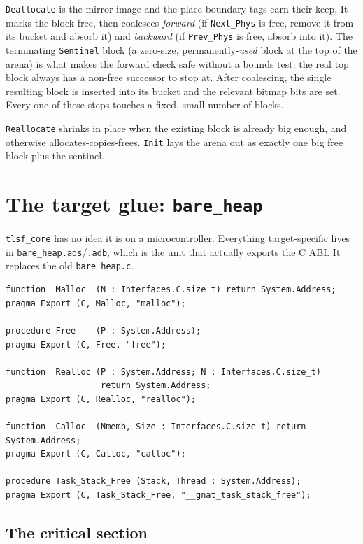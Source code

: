 \texttt{Deallocate} is the mirror image and the place boundary tags earn their
keep. It marks the block free, then coalesces \emph{forward} (if
\texttt{Next\_Phys} is free, remove it from its bucket and absorb it) and
\emph{backward} (if \texttt{Prev\_Phys} is free, absorb into it). The terminating
\texttt{Sentinel} block (a zero-size, permanently-\emph{used} block at the top
of the arena) is what makes the forward check safe without a bounds test: the
real top block always has a non-free successor to stop at. After coalescing, the
single resulting block is inserted into its bucket and the relevant bitmap bits
are set. Every one of these steps touches a fixed, small number of blocks.

\texttt{Reallocate} shrinks in place when the existing block is already big
enough, and otherwise allocates-copies-frees. \texttt{Init} lays the arena out as
exactly one big free block plus the sentinel.

\section{The target glue: \texttt{bare\_heap}}

\texttt{tlsf\_core} has no idea it is on a microcontroller. Everything
target-specific lives in \texttt{bare\_heap.ads}/\texttt{.adb}, which is the unit
that actually exports the C ABI. It replaces the old \texttt{bare\_heap.c}.

\begin{lstlisting}
function  Malloc  (N : Interfaces.C.size_t) return System.Address;
pragma Export (C, Malloc, "malloc");

procedure Free    (P : System.Address);
pragma Export (C, Free, "free");

function  Realloc (P : System.Address; N : Interfaces.C.size_t)
                   return System.Address;
pragma Export (C, Realloc, "realloc");

function  Calloc  (Nmemb, Size : Interfaces.C.size_t) return System.Address;
pragma Export (C, Calloc, "calloc");

procedure Task_Stack_Free (Stack, Thread : System.Address);
pragma Export (C, Task_Stack_Free, "__gnat_task_stack_free");
\end{lstlisting}

\subsection{The critical section}

